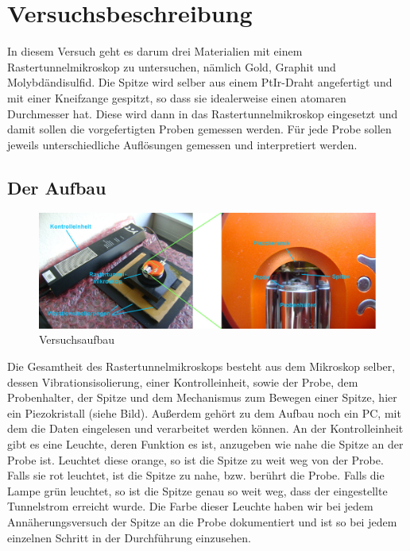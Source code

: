 \section{Versuchsbeschreibung}

In diesem Versuch geht es darum drei Materialien mit einem Rastertunnelmikroskop zu untersuchen, nämlich Gold, Graphit und Molybdändisulfid. Die Spitze wird selber aus einem PtIr-Draht angefertigt und mit einer Kneifzange gespitzt, so dass sie idealerweise einen atomaren Durchmesser hat. Diese wird dann in das Rastertunnelmikroskop eingesetzt und damit sollen die vorgefertigten Proben gemessen werden. Für  jede Probe sollen jeweils unterschiedliche Auflösungen gemessen und interpretiert werden.

\subsection{Der Aufbau}

\begin{figure}[H]
	\centering \includegraphics[width=\textwidth]{Bilder/aufbau.jpg}
	\caption{Versuchsaufbau}
\end{figure}

Die Gesamtheit des Rastertunnelmikroskops besteht aus dem Mikroskop selber, dessen Vibrationsisolierung, einer Kontrolleinheit, sowie der Probe, dem Probenhalter, der Spitze und dem Mechanismus zum Bewegen einer Spitze, hier ein Piezokristall (siehe Bild). Außerdem gehört zu dem Aufbau noch ein PC, mit dem die Daten eingelesen und verarbeitet werden können. 
An der Kontrolleinheit gibt es eine Leuchte, deren Funktion es ist, anzugeben wie nahe die Spitze an der Probe ist. Leuchtet diese orange, so ist die Spitze zu weit weg von der Probe. Falls sie rot leuchtet, ist die Spitze zu nahe, bzw. berührt die Probe. Falls die Lampe grün leuchtet, so ist die Spitze genau so weit weg, dass der eingestellte Tunnelstrom erreicht wurde. Die Farbe dieser Leuchte haben wir bei jedem Annäherungsversuch der Spitze an die Probe dokumentiert und ist so bei jedem einzelnen Schritt in der Durchführung einzusehen.

\clearpage